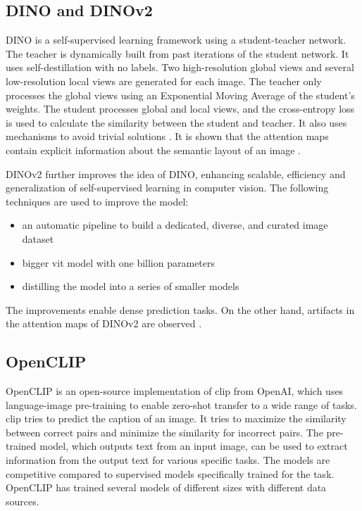 \documentclass[conference]{IEEEtran}
\begin{document}
  \subsection{\mbox{DINO} and \mbox{DINOv2}}
  \label{sec:dino-dinov2}

  \mbox{DINO} is a self-supervised learning framework using a student-teacher network. The teacher is dynamically built from past iterations of the student network. It uses self-destillation with no labels. Two high-resolution global views and several low-resolution local views are generated for each image. The teacher only processes the global views using an Exponential Moving Average of the student's weights. The student processes global and local views, and the cross-entropy loss is used to calculate the similarity between the student and teacher. It also uses mechanisms to avoid trivial solutions \cite{dino}. It is shown that the attention maps contain explicit information about the semantic layout of an image \cite{registers}.

  \mbox{DINOv2} further improves the idea of \mbox{DINO}, enhancing scalable, efficiency and generalization of self-supervised learning in computer vision. The following techniques are used to improve the model:
  \begin{itemize}
    \item  an automatic pipeline to build a dedicated, diverse, and curated image dataset
    \item  bigger \ac{vit} model with one billion parameters
    \item distilling the model into a series of smaller models \cite{dinov2}
  \end{itemize}
  The improvements enable dense prediction tasks. On the other hand, artifacts in the attention maps of \mbox{DINOv2} are observed \cite{registers}.
  
  \subsection{OpenCLIP}
  \label{sec:openclip}
  
  \mbox{OpenCLIP} is an open-source implementation of \ac{clip} \cite{clip} from OpenAI, which uses language-image pre-training to enable zero-shot transfer to a wide range of tasks. \ac{clip} tries to predict the caption of an image. It tries to maximize the similarity between correct pairs and minimize the similarity for incorrect pairs. The pre-trained model, which outputs text from an input image, can be used to extract information from the output text for various specific tasks. The models are competitive compared to supervised models specifically trained for the task. \cite{clip}
  \mbox{OpenCLIP} has trained several models of different sizes with different data sources. \cite{open-clip} 
\end{document}
